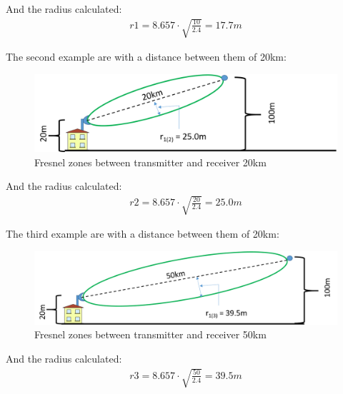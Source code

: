 And the radius calculated:
\begin{align*}
r1 = 8.657\cdot \sqrt{\frac{10}{2.4}} = 17.7m
\end{align*}

The second example are with a distance between them of 20km:

\begin{figure}[H]
	\centering
	\includegraphics[scale=0.50]{figures/fresnel_20km.png}
	\caption{Fresnel zones between transmitter and receiver 20km}
	\label{fig:fresnel_zones_20km}
\end{figure}  

And the radius calculated:
\begin{align*}
r2 = 8.657\cdot \sqrt{\frac{20}{2.4}} = 25.0m
\end{align*}

The third example are with a distance between them of 20km:

\begin{figure}[H]
	\centering
	\includegraphics[scale=0.50]{figures/fresnel_50km.png}
	\caption{Fresnel zones between transmitter and receiver 50km}
	\label{fig:fresnel_zones_50km}
\end{figure}  

And the radius calculated:
\begin{align*}
r3 = 8.657\cdot \sqrt{\frac{50}{2.4}} = 39.5m
\end{align*}

